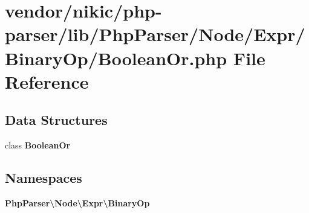 \section{vendor/nikic/php-\/parser/lib/\+Php\+Parser/\+Node/\+Expr/\+Binary\+Op/\+Boolean\+Or.php File Reference}
\label{_boolean_or_8php}
\subsection*{Data Structures}
\begin{DoxyCompactItemize}
\item 
class {\bf Boolean\+Or}
\end{DoxyCompactItemize}
\subsection*{Namespaces}
\begin{DoxyCompactItemize}
\item 
 {\bf Php\+Parser\textbackslash{}\+Node\textbackslash{}\+Expr\textbackslash{}\+Binary\+Op}
\end{DoxyCompactItemize}
